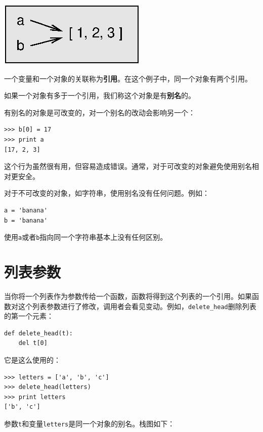 
\beforefig
\centerline{\includegraphics{figs/list3.eps}}
\afterfig

一个变量和一个对象的关联称为{\bf 引用}。在这个例子中，同一个对象有两个引用。


如果一个对象有多于一个引用，我们称这个对象是有{\bf 别名}的。

有别名的对象是可改变的，对一个别名的改动会影响另一个：

\beforeverb
\begin{verbatim}
>>> b[0] = 17
>>> print a
[17, 2, 3]
\end{verbatim}
\afterverb
%
这个行为虽然很有用，但容易造成错误。通常，对于可改变的对象避免使用别名相对更安全。


对于不可改变的对象，如字符串，使用别名没有任何问题。例如：

\beforeverb
\begin{verbatim}
a = 'banana'
b = 'banana'
\end{verbatim}
\afterverb
%
使用{\tt a}或者{\tt b}指向同一个字符串基本上没有任何区别。


\section{列表参数}


当你将一个列表作为参数传给一个函数，函数将得到这个列表的一个引用。如果函数对这个列表参数进行了修改，调用者会看见变动。例如，\verb"delete_head"删除列表的第一个元素：

\beforeverb
\begin{verbatim}
def delete_head(t):
    del t[0]
\end{verbatim}
\afterverb
%
它是这么使用的：

\beforeverb
\begin{verbatim}
>>> letters = ['a', 'b', 'c']
>>> delete_head(letters)
>>> print letters
['b', 'c']
\end{verbatim}
\afterverb
%
参数{\tt t}和变量{\tt letters}是同一个对象的别名。栈图如下：

